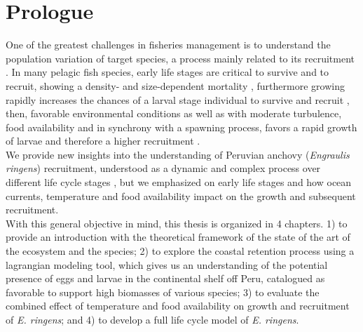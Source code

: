 \chapter{Prologue}

One of the greatest challenges in fisheries management is to understand the population variation of target species, a process mainly related to its recruitment \citep{Cush1971,Lask1981,MaunThor2019}. In many pelagic fish species, early life stages are critical to survive and to recruit, showing a density- and size-dependent mortality \citep{StigRoge2019}, furthermore growing rapidly increases the chances of a larval stage individual to survive and recruit \citep{OsseBoog1997,Soga1997,MeekVigl2006}, then, favorable environmental conditions as well as with moderate turbulence, food availability and in synchrony with a spawning process, favors a rapid growth of larvae and therefore a higher recruitment \citep{CuryRoy1989}.\\

We provide new insights into the understanding of Peruvian anchovy (\textit{Engraulis ringens}) recruitment, understood as a dynamic and complex process over different life cycle stages \citep{DuffBail2005}, but we emphasized on early life stages and how ocean currents, temperature and food availability impact on the growth and subsequent recruitment.\\

With this general objective in mind, this thesis is organized in 4 chapters. 1) to provide an introduction with the theoretical framework of the state of the art of the ecosystem and the species; 2) to explore the coastal retention process using a lagrangian modeling tool, which gives us an understanding of the potential presence of eggs and larvae in the continental shelf off Peru, catalogued as favorable to support high biomasses of various species; 3) to evaluate the combined effect of temperature and food availability on growth and recruitment of \textit{E. ringens}; and 4) to develop a full life cycle model of \textit{E. ringens}. 